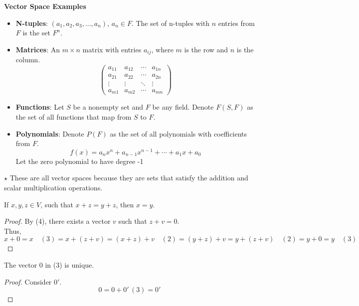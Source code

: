 \documentclass{article}
\begin{document}
 \textbf{Vector Space Examples}
 \begin{itemize}
     \item \textbf{N-tuples}: $(a_1, a_2, a_3, \ldots, a_n)$, $a_n \in F$. The set of n-tuples with $n$ entries from $F$ is the set $F^n$.
     \item \textbf{Matrices}: An $m \times n$ matrix with entries $a_{ij}$, where $m$ is the row and $n$ is the column.\\
     \[
     \begin{pmatrix}
         a_{11} & a_{12} & \cdots & a_{1n} \\
         a_{21} & a_{22} & \cdots & a_{2n} \\
         \vdots & \vdots & \ddots & \vdots \\ 
         a_{m1} & a_{m2} & \cdots & a_{mn}
     \end{pmatrix}
     \]
     \item \textbf{Functions}: Let $S$ be a nonempty set and $F$ be any field. Denote $F(S, F)$ as the set of all functions that map from $S$ to $F$.
     \item \textbf{Polynomials}: Denote $P(F)$ as the set of all polynomials with coefficients from $F$.
     \[
         f(x) = a_nx^n + a_{n-1}x^{n-1} + \cdots + a_1 x + a_0
     \]
     Let the zero polynomial to have degree -1
 \end{itemize}
 
 $\star$ These are all vector spaces because they are sets that satisfy the addition and scalar multiplication operations.
 
 \begin{theorem}
 If $x, y, z \in V$, such that $x + z = y + z$, then $x = y$.
 \end{theorem}
 
 \begin{proof}
     By (4), there exists a vector $v$ such that $z + v = 0$. \\
     Thus,
     \[
     x + 0 = x \quad (3) = x + (z + v) = (x + z) + v \quad (2) = (y + z) + v = y + (z + v) \quad (2) = y + 0 = y \quad (3)
     \]
 \end{proof}
 
 \begin{corollary}
 The vector $0$ in (3) is unique.
 \end{corollary}
 
 \begin{proof}
     Consider $0'$.
     \[
     0 = 0 + 0' \,(3) = 0'
     \]
 \end{proof}
 
\end{document}

